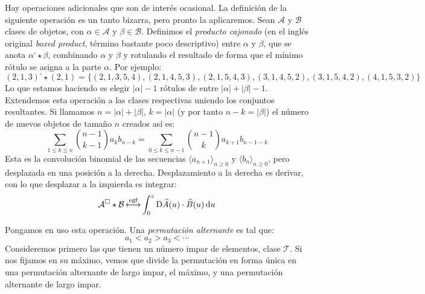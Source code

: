   Hay operaciones adicionales que son de interés ocasional.
  La definición de la siguiente operación es un tanto bizarra,
  pero pronto la aplicaremos.
  Sean \(\mathcal{A}\) y \(\mathcal{B}\) clases de objetos,
  con \(\alpha \in \mathcal{A}\) y \(\beta \in \mathcal{B}\).
  Definimos el \emph{producto cajonado}%
  (en el inglés original
     \emph{\foreignlanguage{english}{boxed product}},
   término bastante poco descriptivo)
  entre \(\alpha\) y \(\beta\),
  que se anota \(\alpha^{\square} \star \beta\),
  combinando \(\alpha\) y \(\beta\)
  y rotulando el resultado de forma que el mínimo rótulo
  se asigna a la parte \(\alpha\).
  Por ejemplo:
  \begin{equation*}
    (2, 1, 3)^\square \star (2, 1)
      = \{(2, 1, 3, 5, 4),
	  (2, 1, 4, 5, 3),
	  (2, 1, 5, 4, 3),
	  (3, 1, 4, 5, 2),
	  (3, 1, 5, 4, 2),
	  (4, 1, 5, 3, 2)
	\}
  \end{equation*}
  Lo que estamos haciendo
  es elegir \(\lvert \alpha \rvert - 1\) rótulos
  de entre \(\lvert \alpha \rvert + \lvert \beta \rvert - 1\).
  Extendemos esta operación a las clases respectivas
  uniendo los conjuntos resultantes.
  Si llamamos \(n = \lvert \alpha \rvert + \lvert \beta \rvert\),
  \(k = \lvert \alpha \rvert\)
  (y por tanto \(n - k = \lvert \beta \rvert\))
  el número de nuevos objetos de tamaño \(n\) creados así es:
  \begin{equation*}
    \sum_{1 \le k \le n}
      \binom{n - 1}{k - 1} a_k b_{n - k}
      = \sum_{0 \le k \le n - 1}
	  \binom{n - 1}{k} a_{k + 1} b_{n - 1 - k}
  \end{equation*}
  Esta es la convolución binomial
  de las secuencias \(\langle a_{n + 1} \rangle_{n \ge 0}\)
  y \(\langle b_n \rangle_{n \ge 0}\),
  pero desplazada en una posición a la derecha.
  Desplazamiento a la derecha es derivar,
  con lo que desplazar a la izquierda es integrar:
  \begin{equation*}
    \mathcal{A}^\square \star \mathcal{B}
      \operatorname{\stackrel{\text{egf}}{\longleftrightarrow}} \int_0^z \mathrm{D} \widehat{A}(u)
		  \cdot \widehat{B}(u) \, \mathrm{d} u
  \end{equation*}

  Pongamos en uso esta operación.
  Una \emph{permutación alternante}%
  es tal que:
  \begin{equation*}
    a_1 < a_2 > a_3 < \dotsb
  \end{equation*}
  Consideremos primero las que tienen un número impar de elementos,
  clase \(\mathcal{T}\).
  Si nos fijamos en su máximo,
  vemos que divide la permutación en forma única
  en una permutación alternante de largo impar,
  el máximo,
  y una permutación alternante de largo impar.

